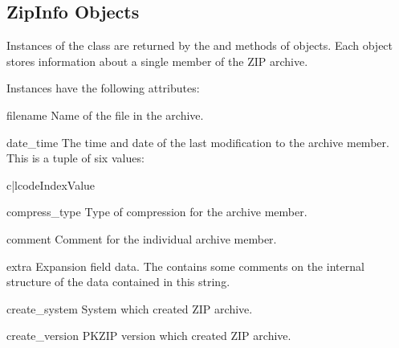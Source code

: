 \subsection{ZipInfo Objects \label{zipinfo-objects}}

Instances of the  class are returned by the
 and  methods of
 objects.  Each object stores information about a
single member of the ZIP archive.

Instances have the following attributes:

\begin{memberdesc}[ZipInfo]{filename}
  Name of the file in the archive.
\end{memberdesc}

\begin{memberdesc}[ZipInfo]{date_time}
  The time and date of the last modification to the archive
  member.  This is a tuple of six values:

\begin{tableii}{c|l}{code}{Index}{Value}
\end{tableii}
\end{memberdesc}

\begin{memberdesc}[ZipInfo]{compress_type}
  Type of compression for the archive member.
\end{memberdesc}

\begin{memberdesc}[ZipInfo]{comment}
  Comment for the individual archive member.
\end{memberdesc}

\begin{memberdesc}[ZipInfo]{extra}
  Expansion field data.  The
   contains some comments on the internal structure of the data
  contained in this string.
\end{memberdesc}

\begin{memberdesc}[ZipInfo]{create_system}
  System which created ZIP archive.
\end{memberdesc}

\begin{memberdesc}[ZipInfo]{create_version}
  PKZIP version which created ZIP archive.
\end{memberdesc}

